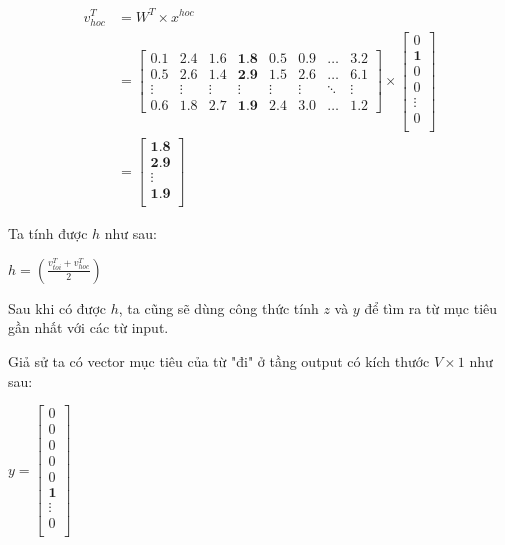 \begin{center}
    \begin{equation}
        \begin{split}
            v^T_{hoc} & = W^T\times x^{hoc} \\
            & = 
            \begin{bmatrix}
                0.1 & 2.4 & 1.6 & \textbf{1.8} & 0.5 & 0.9 & \dots & 3.2 \\
                0.5 & 2.6 & 1.4 & \textbf{2.9} & 1.5 & 2.6 & \dots & 6.1 \\
                \vdots & \vdots & \vdots & \vdots & \vdots & \vdots & \ddots & \vdots \\
                0.6 & 1.8 & 2.7 & \textbf{1.9} & 2.4 & 3.0 & \dots & 1.2
            \end{bmatrix} \times 
            \begin{bmatrix}
                0\\
                \textbf{1} \\
                0 \\
                0 \\
                \vdots \\
                0 \\
            \end{bmatrix} \\
            & = 
            \begin{bmatrix}
                \textbf{1.8} \\
                \textbf{2.9} \\
                \vdots \\
                \textbf{1.9} \\
            \end{bmatrix}
        \end{split}
    \end{equation}
\end{center}

Ta tính được $h$ như sau:
\begin{center}
    $h = \left( \frac{v^T_{toi} + v^T_{hoc}}{2} \right)$
\end{center}

Sau khi có được $h$, ta cũng sẽ dùng công thức tính $z$ và $y$ để tìm ra từ mục tiêu gần nhất với các từ input.

Giả sử ta có vector mục tiêu của từ "đi" ở tầng output có kích thước $V\times 1$ như sau:
\begin{center}
    $y = 
    \begin{bmatrix}
        0 \\
        0 \\
        0 \\
        0 \\
        0 \\
        \textbf{1} \\
        \vdots \\
        0 \\
    \end{bmatrix}
    $
\end{center}

